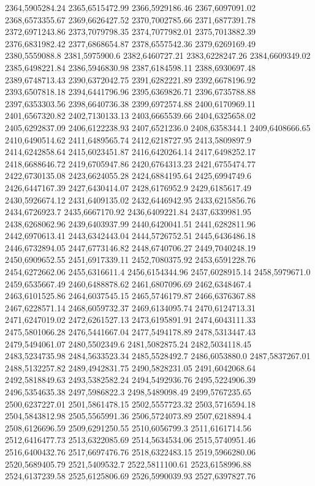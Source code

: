 2364,5905284.24
2365,6515472.99
2366,5929186.46
2367,6097091.02
2368,6573355.67
2369,6626427.52
2370,7002785.66
2371,6877391.78
2372,6971243.86
2373,7079798.35
2374,7077982.01
2375,7013882.39
2376,6831982.42
2377,6868654.87
2378,6557542.36
2379,6269169.49
2380,5559088.8
2381,5975900.6
2382,6460727.21
2383,6228247.26
2384,6609349.02
2385,6498221.84
2386,5946830.98
2387,6184598.11
2388,6930697.48
2389,6748713.43
2390,6372042.75
2391,6282221.89
2392,6678196.92
2393,6507818.18
2394,6441796.96
2395,6369826.71
2396,6735788.88
2397,6353303.56
2398,6640736.38
2399,6972574.88
2400,6170969.11
2401,6567320.82
2402,7130133.13
2403,6665539.66
2404,6325658.02
2405,6292837.09
2406,6122238.93
2407,6521236.0
2408,6358344.1
2409,6408666.65
2410,6490514.62
2411,6489565.74
2412,6218727.95
2413,5809897.9
2414,6242858.64
2415,6023451.87
2416,6420264.14
2417,6498252.17
2418,6688646.72
2419,6705947.86
2420,6764313.23
2421,6755474.77
2422,6730135.08
2423,6624055.28
2424,6884195.64
2425,6994749.6
2426,6447167.39
2427,6430414.07
2428,6176952.9
2429,6185617.49
2430,5926674.12
2431,6409135.02
2432,6446942.95
2433,6215856.76
2434,6726923.7
2435,6667170.92
2436,6409221.84
2437,6339981.95
2438,6268062.96
2439,6403937.99
2440,6420041.51
2441,6282811.96
2442,6970613.41
2443,6342443.04
2444,5726752.51
2445,6436486.18
2446,6732894.05
2447,6773146.82
2448,6740706.27
2449,7040248.19
2450,6909652.55
2451,6917339.11
2452,7080375.92
2453,6591228.76
2454,6272662.06
2455,6316611.4
2456,6154344.96
2457,6028915.14
2458,5979671.0
2459,6535667.49
2460,6488878.62
2461,6807096.69
2462,6348467.4
2463,6101525.86
2464,6037545.15
2465,5746179.87
2466,6376367.88
2467,6228571.14
2468,6059732.37
2469,6134095.74
2470,6124713.31
2471,6247019.02
2472,6261527.13
2473,6195891.91
2474,6043111.33
2475,5801066.28
2476,5441667.04
2477,5494178.89
2478,5313447.43
2479,5494061.07
2480,5502349.6
2481,5082875.24
2482,5034118.45
2483,5234735.98
2484,5633523.34
2485,5528492.7
2486,6053880.0
2487,5837267.01
2488,5132257.82
2489,4942831.75
2490,5828231.05
2491,6042068.64
2492,5818849.63
2493,5382582.24
2494,5492936.76
2495,5224906.39
2496,5354635.38
2497,5986822.3
2498,5489098.49
2499,5767235.65
2500,6237227.01
2501,5861478.15
2502,5557723.32
2503,5716594.18
2504,5843812.98
2505,5565991.36
2506,5724073.89
2507,6218894.4
2508,6126696.59
2509,6291250.55
2510,6056799.3
2511,6161714.56
2512,6416477.73
2513,6322085.69
2514,5634534.06
2515,5740951.46
2516,6400432.76
2517,6697476.76
2518,6322483.15
2519,5966280.06
2520,5689405.79
2521,5409532.7
2522,5811100.61
2523,6158996.88
2524,6137239.58
2525,6125806.69
2526,5990039.93
2527,6397827.76
